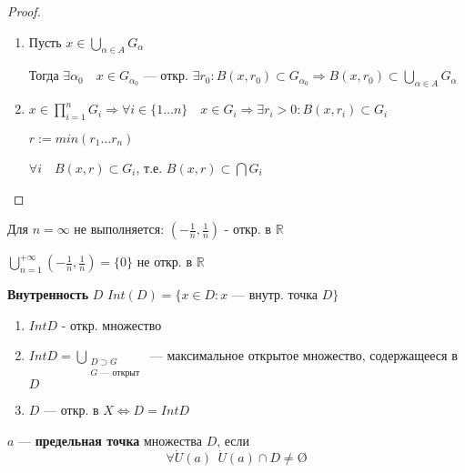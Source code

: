 \begin{proof}
    \begin{enumerate}
        \item Пусть $x\in \bigcup_{\alpha\in A} G_\alpha$
        
        Тогда $\exists \alpha_0 \quad x\in G_{\alpha_0}$ --- откр. $\exists r_0 : B(x,r_0)\subset G_{\alpha_0} \Rightarrow B(x,r_0)\subset\bigcup_{\alpha\in A} G_\alpha$

        \item $x\in \prod_{i=1}^n G_i \Rightarrow \forall i\in\{1\ldots n\} \quad x\in G_i \Rightarrow \exists r_i>0 : B(x,r_i)\subset G_i$
        
        $r:=min(r_1\ldots r_n)$

        $\forall i \quad B(x,r)\subset G_i$, т.е. $B(x,r)\subset\bigcap G_i$
    \end{enumerate}
\end{proof}

\begin{remark}
    Для $n=\infty$ не выполняется: $(-\frac{1}{n},\frac{1}{n})$ - откр. в $\mathbb{R}$

    $\bigcup_{n=1}^{+\infty}(-\frac{1}{n},\frac{1}{n})=\{0\}$ не откр. в $\mathbb{R}$
\end{remark}

\begin{definition}
    \textbf{Внутренность} $D$ $Int(D)=\{x\in D : x \text{ --- внутр. точка }D\}$
\end{definition}

\begin{remark}
    \begin{enumerate}
        \item $Int D$ - откр. множество
        \item $Int D = \bigcup\limits_{\substack{D\supset G \\ G\text{ --- открыт}}}$ --- максимальное открытое множество, содержащееся в $D$
        \item $D$ --- откр. в $X \Leftrightarrow D=Int D$
    \end{enumerate}
\end{remark}

\begin{definition}
    $a$ --- {\bf предельная точка} множества $D$, если $$\forall \dot U(a) \ \ \dot U(a)\cap D\not = \text{\O}$$
\end{definition}

